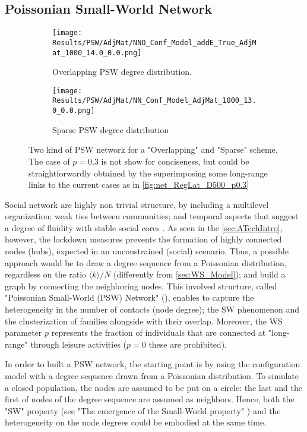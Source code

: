 \documentclass[a4paper,10pt,twoside]{book} %
\theoremstyle{definition}
\begin{document}
\subsection{Poissonian Small-World Network}
\label{sec:PSW_network}
\begin{figure}[ht]
    \begin{subfigure}{.45\linewidth}
        \texttt{[image: Results/PSW/AdjMat/NNO\_Conf\_Model\_addE\_True\_AdjMat\_1000\_14.0\_0.0.png]}
        \centering
        \caption{Overlapping PSW degree distribution. }
        \label{fig:netmod_O-PSW}
    \end{subfigure}
	\hfill
	\begin{subfigure}{.45\linewidth}
        \texttt{[image: Results/PSW/AdjMat/NN\_Conf\_Model\_AdjMat\_1000\_13.0\_0.0.png]}
        \centering
        \caption{Sparse PSW degree distribution}
        \label{fig:netmod_S-PSW}
    \end{subfigure}
	\caption{Two kind of PSW network for a "Overlapping" and "Sparse" scheme. The case of $p = 0.3$ is not show for conciseness, but could be straightforwardly obtained by the superimposing some long-range links to the current cases as in \autoref{fig:net_RegLat_D500_p0.3}}
\end{figure}
Social network are highly non trivial structure, by including a multilevel organization; weak ties between communities; and temporal aspects that suggest a degree of fluidity with stable social cores \cite{Thurner::NetBasedExpl}.
As seen in the \autoref{sec:ATechIntro}, however, the lockdown measures prevents the formation of highly connected nodes (hubs), expected in an unconstrained (social) scenario. Thus, a possible approach would be to draw a degree sequence from a Poissonian distribution, regardless on the ratio $\langle k \rangle / N$ (differently from \autoref{sec:WS_Model}); and build a graph by connecting the neighboring nodes.
This involved structure, called "Poissonian Small-World (PSW) Network" (\cite{Thurner::NetBasedExpl}), enables to capture the heterogeneity in the number of contacts (node degree); the SW phenomenon and the clusterization of families alongside with their overlap. Moreover, the WS parameter $p$ represents the fraction of individuals that are connected at "long-range" through leisure activities ($p = 0$ these are prohibited).

In order to built a PSW network, the starting point is by using the configuration model with a degree sequence drawn from a Poissonian distribution. To simulate a closed population, the nodes are assumed to be put on a circle: the last and the first of nodes of the degree sequence are assumed as neighbors. Hence, both the "SW" property (see "The emergence of the Small-World property" ) and the heterogeneity on the node degrees could be embodied at the same time. 
\end{document}
